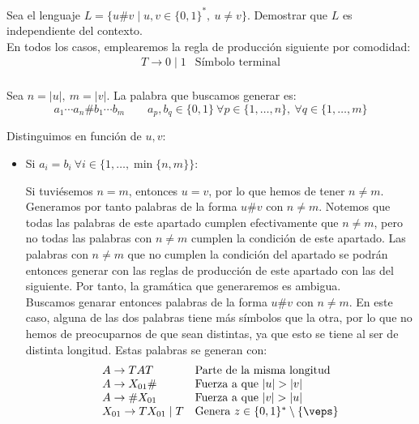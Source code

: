 \begin{ejercicio}\label{ej:1.4.18}
    Sea el lenguaje $L = \{ u\#v\mid u,v\in \{0,1\}^*,~u\neq v\}$. Demostrar que $L$ es independiente del contexto.\\

    En todos los casos, emplearemos la regla de producción siguiente por comodidad:
    \begin{equation*}
        \begin{array}{ll}
            T \to 0\mid 1 & \text{Símbolo terminal}\\
        \end{array}
    \end{equation*}

    Sea $n=|u|,~m=|v|$. La palabra que buscamos generar es:
    \begin{equation*}
        {a_1\cdots a_n}
        {\#}
        {b_1\cdots b_m}\qquad  a_p,b_q\in \{0,1\}~\forall p\in \{1,\ldots,n\},~\forall q\in \{1,\ldots,m\}
    \end{equation*}

    Distinguimos en función de $u,v$:
    \begin{itemize}
        \item Si $a_i=b_i~\forall i\in \{1,\ldots,\min\{n,m\}\}$:
        
        Si tuviésemos $n=m$, entonces $u=v$, por lo que hemos de tener $n\neq m$. Generamos por tanto palabras de la forma $u\#v$ con $n\neq m$.
        Notemos que todas las palabras de este apartado cumplen efectivamente que $n\neq m$, pero no todas las palabras con $n\neq m$ cumplen la condición de este apartado. Las palabras con $n\neq m$ que no cumplen la condición del apartado se podrán entonces generar con las reglas de producción de este apartado con las del siguiente. Por tanto, la gramática que generaremos es ambigua.\\

        Buscamos genarar entonces palabras de la forma $u\#v$ con $n\neq m$.
        En este caso, alguna de las dos palabras tiene más símbolos que la otra, por lo que no hemos de preocuparnos de que sean distintas, ya que esto se tiene al ser de distinta longitud. Estas palabras se generan con:
        \begin{equation*}
            \begin{array}{ll}
                A\to TAT & \text{Parte de la misma longitud}\\
                A\to X_{01}\# & \text{Fuerza a que }|u|>|v|\\
                A\to \#X_{01} & \text{Fuerza a que }|v|>|u|\\
                X_{01} \to TX_{01}\mid T & \text{Genera }z\in \{0,1\}^*\setminus \{\veps\}
            \end{array}
        \end{equation*}


\end{itemize}
\end{ejercicio}
